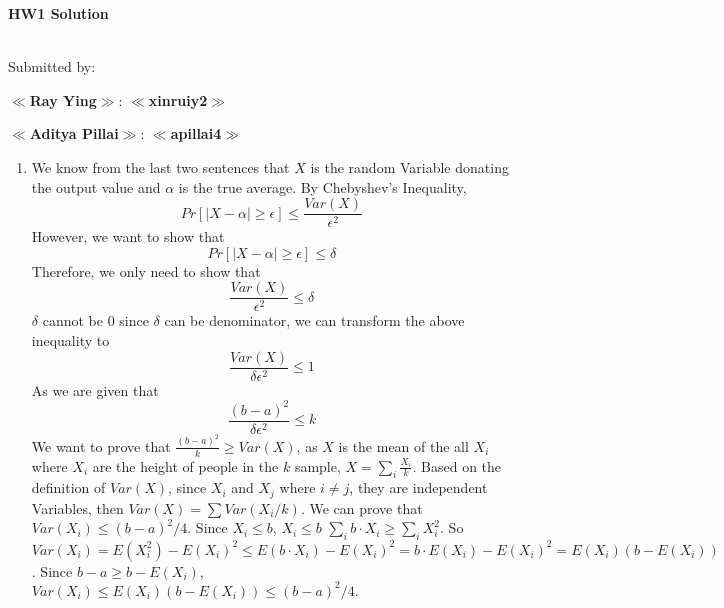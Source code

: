 \documentclass[11pt]{article}%
\begin{document}
\noindent\textbf{\LARGE HW{1} Solution}\\
\noindent{\textbf{\Course: \CourseName, \Semester}}
\hfill{}%
\\[-0.12cm]
%
\Hr%
\smallskip%

\noindent%
Submitted by:
\begin{compactitem}
    \item \textbf{$\ll$Ray Ying$\gg$}:
    \textbf{$\ll$xinruiy2$\gg$}
    \item \textbf{$\ll$Aditya Pillai$\gg$}:
    \textbf{$\ll$apillai4$\gg$}
\end{compactitem}
\Hr
\medskip
\SaveIndent%

\begin{questions}[1]
    \item   
    \begin{enumerate}
    \item   We know from the last two sentences that $X$ is the random Variable donating the output value and $\alpha$ is the true average. By Chebyshev's Inequality, 
    $$Pr[|X-\alpha| \geq \epsilon] \leq \frac{Var(X)}{\epsilon ^2} $$
    However, we want to show that 
    $$Pr[|X-\alpha| \geq \epsilon] \leq \delta $$
    Therefore, we only need to show that 
    $$\frac{Var(X)}{\epsilon ^2} \leq \delta $$
    $\delta$ cannot be $0$ since $\delta$ can be denominator, we can transform the above inequality to 
    $$\frac{Var(X)}{\delta \epsilon ^2} \leq 1$$
    As we are given that 
    $$\frac{(b-a)^2}{\delta \epsilon ^2} \leq k$$
    We want to prove that $\frac{(b-a)^2}{k}\geq Var(X)$, as $X$ is the mean of the all $X_i$ where $X_i$ are the height of people in the $k$ sample, $X = \sum_i\frac {X_i}{k}$.
    \newline
    \newline
    Based on the definition of $Var(X)$, since $X_i$ and $X_j$ where $i \neq j$, they are independent Variables, then $Var(X) = \sum Var(X_i/k)$.
    \newline
    \newline
    We can prove that $Var(X_i) \leq (b-a)^2/4$.
    Since $X_i \leq b$, $X_i \leq b$ $\sum_i b \cdot X_i \geq \sum_i X_i^2$. So $Var(X_i) = E(X_i^2) - E(X_i)^2 \leq E(b \cdot X_i) - E(X_i)^2 = b\cdot E(X_i) - E(X_i)^2 = E(X_i)(b - E(X_i))$. Since $b-a \geq b-E(X_i)$, $Var(X_i) \leq E(X_i)(b - E(X_i)) \leq  (b-a)^2/4.$
    \newline


\end{enumerate}
\end{questions}
\end{document}
